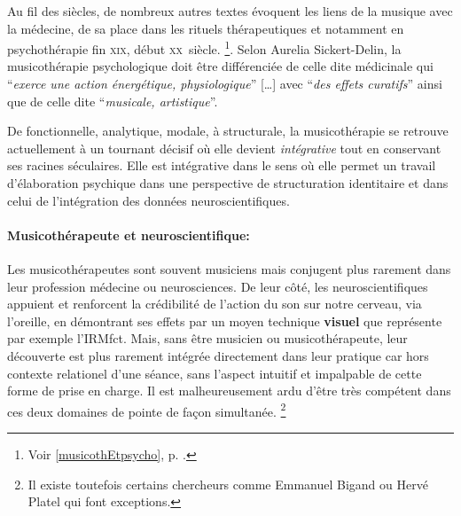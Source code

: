  Au fil des siècles, de nombreux autres 
textes évoquent les liens de la musique avec la médecine, de sa place dans les 
rituels thérapeutiques et notamment en psychothérapie fin \textsc{xix}\ieme, 
début \textsc{xx}\ieme\ siècle. \footnote{Voir \ref{musicothEtpsycho},
  p. \pageref{musicothEtpsycho}.}.
Selon Aurelia Sickert-Delin, la musicothérapie 
psychologique doit être différenciée de celle dite médicinale qui 
\enquote{\emph{exerce une action 
énergétique, physiologique}} [\dots] avec \enquote{\emph{des effets curatifs}}  
ainsi que de celle dite \enquote{\emph{musicale, artistique}}. 

 De fonctionnelle, analytique, mo\-da\-le,  à 
struc\-tu\-rale, la musicothérapie se retrouve actuellement 
 à un tournant décisif où elle devient 
 \emph{intégrative} tout en conservant ses racines séculaires. Elle est 
intégrative dans le sens où elle permet un travail d'élaboration psychique dans une perspective de structuration identitaire \autocite[ch. III, p. 53, 
105]{vrait_musicotherapie_2018} et dans celui de l'intégration des données 
neuroscientifiques.
 


 
\paragraph{Musicothérapeute et neuroscientifique: }

 
Les musicothérapeutes sont souvent musiciens mais conjugent plus
rarement dans leur profession
médecine ou neurosciences. De leur côté, les neuroscientifiques appuient
et renforcent la crédibilité de l'action du son sur notre cerveau, via
l'oreille, en démontrant ses effets par un moyen technique
\textbf{visuel} que représente par exemple l'IRMfct. Mais, sans être musicien ou
musicothérapeute, leur découverte est plus rarement intégrée
directement dans leur pratique car hors contexte relationel d'une
séance, sans l'aspect intuitif et impalpable de cette forme de prise
en charge.
Il est malheureusement ardu d'être très compétent dans ces deux domaines
de pointe de façon simultanée.   \footnote  {Il existe toutefois certains chercheurs
comme Emmanuel Bigand ou Hervé Platel qui font exceptions.}

